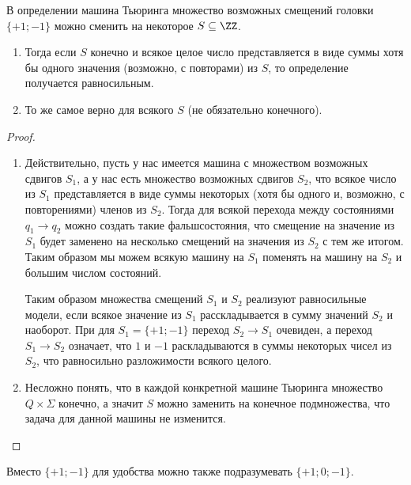 \documentclass[12pt,a4paper]{article}
\begin{document}
    \begin{theorem}
        В определении машина Тьюринга множество возможных смещений головки $\{+1; -1\}$ можно сменить на некоторое $S \subseteq \ZZ$.
        \begin{enumerate}
            \item Тогда если $S$ конечно и всякое целое число представляется в виде суммы хотя бы одного значения (возможно, с повторами) из $S$, то определение получается равносильным.
            \item То же самое верно для всякого $S$ (не обязательно конечного).
        \end{enumerate}
    \end{theorem}

    \begin{proof}
        \begin{enumerate}
            \item Действительно, пусть у нас имеется машина с множеством возможных сдвигов $S_1$, а у нас есть множество возможных сдвигов $S_2$, что всякое число из $S_1$ представляется в виде суммы некоторых (хотя бы одного и, возможно, с повторениями) членов из $S_2$. Тогда для всякой перехода между состояниями $q_1 \to q_2$ можно создать такие фальшсостояния, что смещение на значение из $S_1$ будет заменено на несколько смещений на значения из $S_2$ с тем же итогом. Таким образом мы можем всякую машину на $S_1$ поменять на машину на $S_2$ и большим числом состояний.
        
                Таким образом множества смещений $S_1$ и $S_2$ реализуют равносильные модели, если всякое значение из $S_1$ расскладывается в сумму значений $S_2$ и наоборот. При для $S_1 = \{+1; -1\}$ переход $S_2 \to S_1$ очевиден, а переход $S_1 \to S_2$ означает, что $1$ и $-1$ раскладываются в суммы некоторых чисел из $S_2$, что равносильно разложимости всякого целого.

            \item Несложно понять, что в каждой конкретной машине Тьюринга множество $Q \times \Sigma$ конечно, а значит $S$ можно заменить на конечное подмножества, что задача для данной машины не изменится.
        \end{enumerate}
    \end{proof}

    \begin{corollary}
        Вместо $\{+1; -1\}$ для удобства можно также подразумевать $\{+1; 0; -1\}$.
    \end{corollary}
\end{document}
